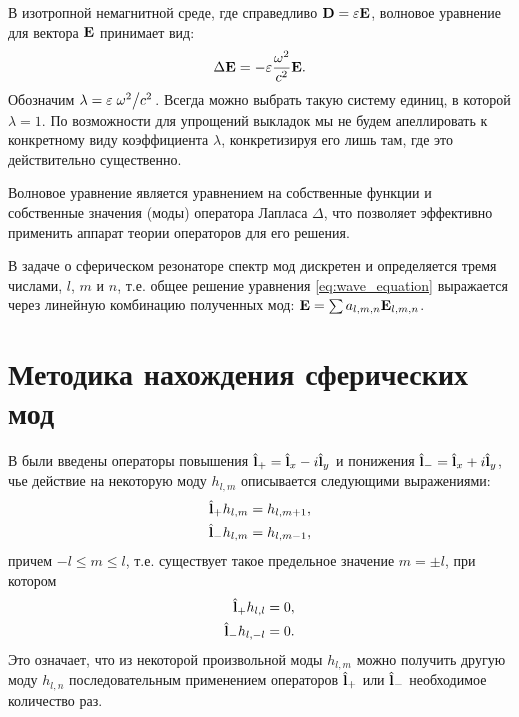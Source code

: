 \documentclass[12pt,a4paper]{article}
\begin{document}
        В изотропной немагнитной среде, где справедливо $\mathbf{D} = \varepsilon \mathbf{E}$, волновое уравнение для вектора $\mathbf{E}$ принимает вид:
        \begin{equation}\label{eq:wave_equation}
            \Delta \mathbf{E} = - \varepsilon \frac{\omega^2}{c^2} \mathbf{E} .
        \end{equation}
        Обозначим $\lambda = \varepsilon \flatfrac{\omega^2}{c^2}$. Всегда можно выбрать такую систему единиц, в которой $\lambda = 1$. По возможности для упрощений выкладок мы не будем апеллировать к конкретному виду коэффициента $\lambda$, конкретизируя его лишь там, где это действительно существенно.

        Волновое уравнение является уравнением на собственные функции и собственные значения (моды) оператора Лапласа $\Delta$, что позволяет эффективно применить аппарат теории операторов для его решения.

        В задаче о сферическом резонаторе спектр мод дискретен и определяется тремя числами, $l$, $m$ и $n$, т.е. общее решение уравнения \autoref{eq:wave_equation} выражается через линейную комбинацию полученных мод: $\mathbf{E} = \sum a_{l,m,n} \mathbf{E}_{l,m,n}$.


    \section{Методика нахождения сферических мод}

        В \cite{math_appendix} были введены операторы повышения $\hat{\mathbf{l}}_{+} = \hat{\mathbf{l}}_x - i \hat{\mathbf{l}}_y$ и понижения $\hat{\mathbf{l}}_{-} = \hat{\mathbf{l}}_x + i \hat{\mathbf{l}}_y$, чье действие на некоторую моду $h_{l, m}$ описывается следующими выражениями:
        \begin{equation}\begin{aligned}
            \hat{\mathbf{l}}_{+} h_{l, m} &= h_{l, m+1} , \\
            \hat{\mathbf{l}}_{-} h_{l, m} &= h_{l, m-1} ,
        \end{aligned}\end{equation}
        причем $- l \le m \le l$, т.е. существует такое предельное значение $m = \pm l$, при котором
        \begin{equation}\begin{aligned}
            \hat{\mathbf{l}}_{+} h_{l, l}   &= 0 , \\
            \hat{\mathbf{l}}_{-} h_{l, - l} &= 0 .
        \end{aligned}\end{equation}
        Это означает, что из некоторой произвольной моды $h_{l, m}$ можно получить другую моду $h_{l, n}$ последовательным применением операторов $\hat{\mathbf{l}}_{+}$ или $\hat{\mathbf{l}}_{-}$ необходимое количество раз.
\end{document}
